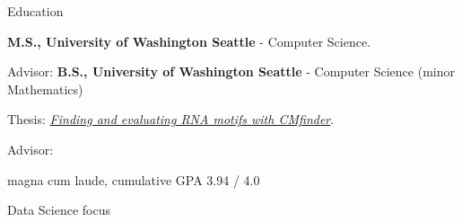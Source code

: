 \begin{rubric}{Education}

	\textbf{M.S., University of Washington Seattle} - Computer Science.
    \par Advisor: \pWeldD{}
\entry*[2016 -- 2019]%
	\textbf{B.S., University of Washington Seattle} - Computer Science (minor Mathematics)
	\par Thesis: \href{https://cephcyn.github.io/pub/2019-bachelors_thesis-Finding_and_evaluating_RNA_motifs_with_CMfinder.pdf}{\emph{Finding and evaluating RNA motifs with CMfinder}}.
	\par Advisor: \pRuzzoL{}
	\par magna cum laude, cumulative GPA 3.94 / 4.0
	\par Data Science focus
\end{rubric}
